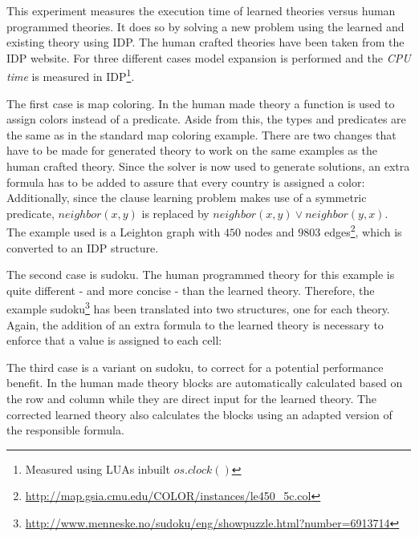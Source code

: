 \begin{experiment}
\label{exp:human_speed}
	This experiment measures the execution time of learned theories versus human programmed theories.
	It does so by solving a new problem using the learned and existing theory using IDP.
	The human crafted theories have been taken from the IDP website.
	For three different cases model expansion is performed and the \emph{CPU time} is measured in IDP\footnote{Measured using LUAs inbuilt $os.clock()$}.

	The first case is map coloring.
	In the human made theory a function is used to assign colors instead of a predicate.
	Aside from this, the types and predicates are the same as in the standard map coloring example.
	There are two changes that have to be made for generated theory to work on the same examples as the human crafted theory.
	Since the solver is now used to generate solutions, an extra formula has to be added to assure that every country is assigned a color:
	Additionally, since the clause learning problem makes use of a symmetric predicate, $\mathit{neighbor}(x, y)$ is replaced by $\mathit{neighbor}(x, y) \lor \mathit{neighbor(y,x)}$.
	The example used is a Leighton graph with $450$ nodes and $9803$ edges\footnote{\url{http://map.gsia.cmu.edu/COLOR/instances/le450_5c.col}}, which is converted to an IDP structure.

	The second case is sudoku.
	The human programmed theory for this example is quite different - and more concise - than the learned theory.
	Therefore, the example sudoku\footnote{\url{http://www.menneske.no/sudoku/eng/showpuzzle.html?number=6913714}} has been translated into two structures, one for each theory.
	Again, the addition of an extra formula to the learned theory is necessary to enforce that a value is assigned to each cell: 

	The third case is a variant on sudoku, to correct for a potential performance benefit.
	In the human made theory blocks are automatically calculated based on the row and column while they are direct input for the learned theory.
	The corrected learned theory also calculates the blocks using an adapted version of the responsible formula.


\end{experiment}
